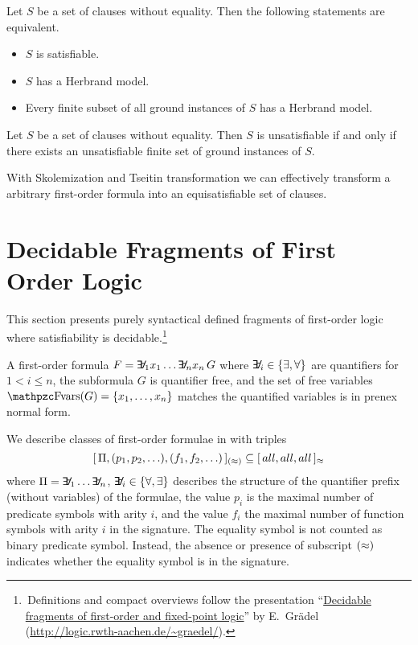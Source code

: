 \begin{theorem}[Herbrand, 1930]\label{the:herbrand}
	Let $S$ be a set of clauses without equality. Then the following statements are equivalent.
	\begin{itemize}
		\item $S$ is satisfiable.
		\item $S$ has a Herbrand model.
		\item Every finite subset of all ground instances of $S$ has a Herbrand model.
	\end{itemize} 
\end{theorem}

\begin{corollary}
	Let $S$ be a set of clauses without equality. 
	Then $S$ is unsatisfiable if and only if there exists 
	an unsatisfiable finite set of ground instances of $S$.
\end{corollary}

\begin{lemma}
With Skolemization and Tseitin transformation we can effectively transform a arbitrary first-order formula into an equisatisfiable set of clauses.	
\end{lemma}


\section{Decidable Fragments of First Order Logic}\label{sec:decidable:fol:fragments}

This section presents purely syntactical defined fragments
of first-order logic where satisfiability is decidable.\footnote{
	\,Definitions and compact overviews follow the presentation
	“\href{http://logic.rwth-aachen.de/~graedel/kalmar.pdf}{Decidable fragments of first-order and fixed-point logic}”
	by E.~Grädel (\url{http://logic.rwth-aachen.de/~graedel/}).	
}  



\begin{definition}[\PNF]
	A first-order formula $F = \quantify_1 x_1 \ldots \quantify_n x_n\, G$ 
	where $\quantify_i \in \{\exists,\forall\}$ are quantifiers
	for $1 < i \leq n$,
	the subformula $G$ is quantifier free, and 
	the set of free variables $\fvar(G) = \{ x_1, \ldots, x_n \}$
	matches the quantified variables
	is in {\myem prenex normal form}.
\end{definition}


\begin{definition}[\cite{MR1482227}]\label{def:prefix:class}
	We describe classes of first-order formulae in \PNF with triples
	\[
	[\, \Pi, (p_1,p_2,\ldots), (f_1,f_2,\ldots)\,]_{(\approx)} \subseteq [\, all, all, all\,]_{\approx}
	\]
	where $\Pi = \quantify_1 \ldots \quantify_n$, $\quantify_i\in\{\forall,\exists\}$ 
	describes the structure of the quantifier prefix (without variables) of the formulae,
	the value $p_i$ is the maximal number of predicate symbols with arity $i$,
	and the value $f_i$ the maximal number of function symbols with arity $i$ in the signature.
	The equality symbol is not counted as binary predicate symbol. Instead,
	the absence or presence of subscript $(\approx)$ indicates whether the equality symbol is in the signature. 
\end{definition}

